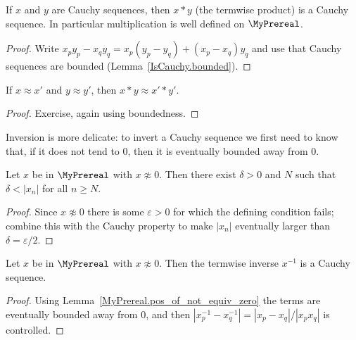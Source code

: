 \begin{lemma}
    \label{MyPrereal.IsCauchy.mul}
    \leanok
If $x$ and $y$ are Cauchy sequences, then $x * y$ (the termwise product) is a Cauchy sequence. In
particular multiplication is well defined on $\MyPrereal$.
\end{lemma}
\begin{proof}
    \leanok
    Write $x_p y_p - x_q y_q = x_p(y_p - y_q) + (x_p - x_q)y_q$ and use that Cauchy sequences are
    bounded (Lemma~\ref{IsCauchy.bounded}).
\end{proof}

\begin{lemma}
    \label{MyPrereal.mul_quotient}
    \leanok
If $x \approx x'$ and $y \approx y'$, then $x * y \approx x' * y'$.
\end{lemma}
\begin{proof}
    \leanok
    Exercise, again using boundedness.
\end{proof}

Inversion is more delicate: to invert a Cauchy sequence we first need to know that, if it does not
tend to $0$, then it is eventually bounded away from $0$.

\begin{lemma}
    \label{MyPrereal.pos_of_not_equiv_zero}
    \leanok
Let $x$ be in $\MyPrereal$ with $x \not\approx 0$. Then there exist $\delta > 0$ and $N$ such that
$\delta < |x_n|$ for all $n \geq N$.
\end{lemma}
\begin{proof}
    \leanok
    Since $x \not\approx 0$ there is some $\varepsilon > 0$ for which the defining condition fails;
    combine this with the Cauchy property to make $|x_n|$ eventually larger than $\delta =
    \varepsilon/2$.
\end{proof}

\begin{lemma}
    \label{MyPrereal.IsCauchy.inv}
    \leanok
Let $x$ be in $\MyPrereal$ with $x \not\approx 0$. Then the termwise inverse $x^{-1}$ is a Cauchy
sequence.
\end{lemma}
\begin{proof}
    \leanok
    Using Lemma~\ref{MyPrereal.pos_of_not_equiv_zero} the terms are eventually bounded away from $0$,
    and then $|x_p^{-1} - x_q^{-1}| = |x_p - x_q| / |x_p x_q|$ is controlled.
\end{proof}

